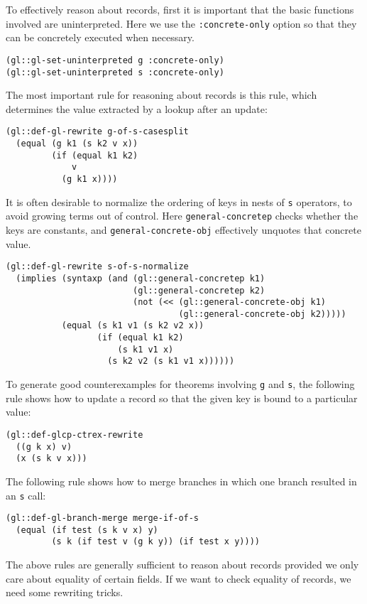 \documentclass[submission,copyright,creativecommons]{eptcs}
\begin{document}
To effectively reason about records, first it is important that the
basic functions involved are uninterpreted.  Here we use the
\texttt{:concrete-only} option so that they can be concretely executed
when necessary.
\begin{verbatim}
(gl::gl-set-uninterpreted g :concrete-only)
(gl::gl-set-uninterpreted s :concrete-only)
\end{verbatim}
The most important rule for reasoning about records is this rule,
which determines the value extracted by a lookup after an update:
\begin{verbatim}
(gl::def-gl-rewrite g-of-s-casesplit
  (equal (g k1 (s k2 v x))
         (if (equal k1 k2)
             v
           (g k1 x))))
\end{verbatim}
It is often desirable to normalize the ordering of keys in nests of
\texttt{s} operators, to avoid growing terms out of control.  Here
\texttt{general-concretep} checks whether the keys are constants, and
\texttt{general-concrete-obj} effectively unquotes that concrete value.
\begin{verbatim}
(gl::def-gl-rewrite s-of-s-normalize
  (implies (syntaxp (and (gl::general-concretep k1)
                         (gl::general-concretep k2)
                         (not (<< (gl::general-concrete-obj k1)
                                  (gl::general-concrete-obj k2)))))
           (equal (s k1 v1 (s k2 v2 x))
                  (if (equal k1 k2)
                      (s k1 v1 x)
                    (s k2 v2 (s k1 v1 x))))))
\end{verbatim}
To generate good counterexamples for theorems involving \texttt{g} and
\texttt{s}, the following rule shows how to update a record so that
the given key is bound to a particular value:
\begin{verbatim}
(gl::def-glcp-ctrex-rewrite
  ((g k x) v)
  (x (s k v x)))
\end{verbatim}
The following rule shows how to merge branches in which one branch
resulted in an \texttt{s} call:
\begin{verbatim}
(gl::def-gl-branch-merge merge-if-of-s
  (equal (if test (s k v x) y)
         (s k (if test v (g k y)) (if test x y))))
\end{verbatim}
The above rules are generally sufficient to reason about records
provided we only care about equality of certain fields.  If we want to
check equality of records, we need some rewriting tricks.
\end{document}
